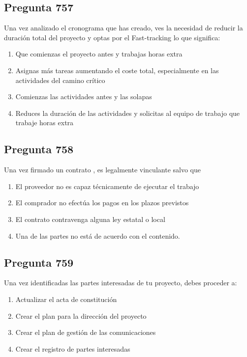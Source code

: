 \documentclass[11pt,a4paper]{article}
\begin{document}
\subsection*{Pregunta 757}
Una vez analizado el cronograma que has creado, ves la necesidad de reducir la duración total del proyecto y optas por el Fast-tracking lo que significa:

\begin{enumerate}[label=\alph*)]
  \item Que comienzas el proyecto antes y trabajas horas extra
  \item Asignas más tareas aumentando el coste total, especialmente en las actividades del camino crítico
  \item Comienzas las actividades antes y las solapas
  \item Reduces la duración de las actividades y solicitas al equipo de trabajo que trabaje horas extra
\end{enumerate}

\subsection*{Pregunta 758}
Una vez firmado un contrato , es legalmente vinculante salvo que

\begin{enumerate}[label=\alph*)]
  \item El proveedor no es capaz técnicamente de ejecutar el trabajo
  \item El comprador no efectúa los pagos en los plazos previstos
  \item El contrato contravenga alguna ley estatal o local
  \item Una de las partes no está de acuerdo con el contenido.
\end{enumerate}

\subsection*{Pregunta 759}
Una vez identificadas las partes interesadas de tu proyecto, debes proceder a:

\begin{enumerate}[label=\alph*)]
  \item Actualizar el acta de constitución
  \item Crear el plan para la dirección del proyecto
  \item Crear el plan de gestión de las comunicaciones
  \item Crear el registro de partes interesadas
\end{enumerate}
\end{document}
